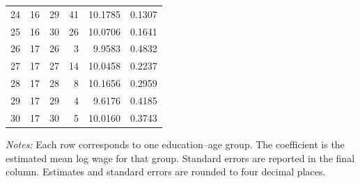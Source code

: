 \begin{table}[htbp]
\begin{tabular}{@{}rrrrrr@{}}
        24 & 16 & 29 & 41  & 10.1785 & 0.1307 \\
        25 & 16 & 30 & 26  & 10.0706 & 0.1641 \\
        \midrule
        26 & 17 & 26 & 3   & 9.9583 & 0.4832 \\
        27 & 17 & 27 & 14  & 10.0458 & 0.2237 \\
        28 & 17 & 28 & 8   & 10.1656 & 0.2959 \\
        29 & 17 & 29 & 4   & 9.6176 & 0.4185 \\
        30 & 17 & 30 & 5   & 10.0160 & 0.3743 \\
        \bottomrule
    \end{tabular}
    \vspace{2pt}
    \parbox{0.92\linewidth}{\footnotesize \textit{Notes:} Each row corresponds to one education--age group. The coefficient is the estimated mean log wage for that group. Standard errors are reported in the final column. Estimates and standard errors are rounded to four decimal places.}
\end{table}

